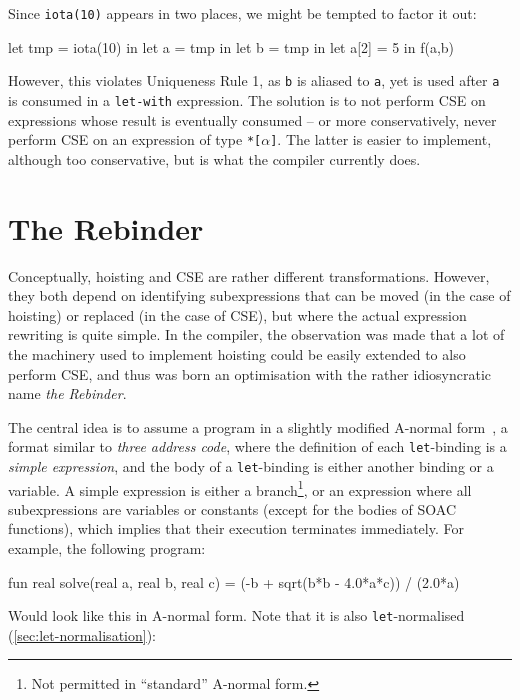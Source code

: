 Since \texttt{iota(10)} appears in two places, we might be tempted to
factor it out:

\begin{colorcode}
let tmp = iota(10) in
let a = tmp in
let b = tmp in
let a[2] = 5 in
f(a,b)
\end{colorcode}

However, this violates Uniqueness Rule 1, as \texttt{b} is aliased to
\texttt{a}, yet is used after \texttt{a} is consumed in a
\texttt{let-with} expression.  The solution is to not perform CSE on
expressions whose result is eventually consumed -- or more
conservatively, never perform CSE on an expression of type
\texttt{*[$\alpha$]}.  The latter is easier to implement, although too
conservative, but is what the \LO{} compiler currently does.

\section{The Rebinder}
\label{sec:rebinder}
Conceptually, hoisting and CSE are rather different transformations.
However, they both depend on identifying subexpressions that can be
moved (in the case of hoisting) or replaced (in the case of CSE), but
where the actual expression rewriting is quite simple.  In the \LO{}
compiler, the observation was made that a lot of the machinery used to
implement hoisting could be easily extended to also perform CSE, and
thus was born an optimisation with the rather idiosyncratic name
\textit{the Rebinder}.

The central idea is to assume a program in a slightly modified
A-normal form~\cite{Sabry:1992:RPC:141478.141563}, a format similar to
\textit{three address code}, where the definition of each
\texttt{let}-binding is a \textit{simple expression}, and the body of
a \texttt{let}-binding is either another binding or a variable.  A
simple expression is either a branch\footnote{Not permitted in
  ``standard'' A-normal form.}, or an expression where all
subexpressions are variables or constants (except for the bodies of
SOAC functions), which implies that their execution terminates
immediately.  For example, the following program:

\begin{colorcode}
fun real solve(real a, real b, real c) =
  (-b + sqrt(b*b - 4.0*a*c)) / (2.0*a)
\end{colorcode}

Would look like this in A-normal form.  Note that it is also
\texttt{let}-normalised (\cref{sec:let-normalisation}):

